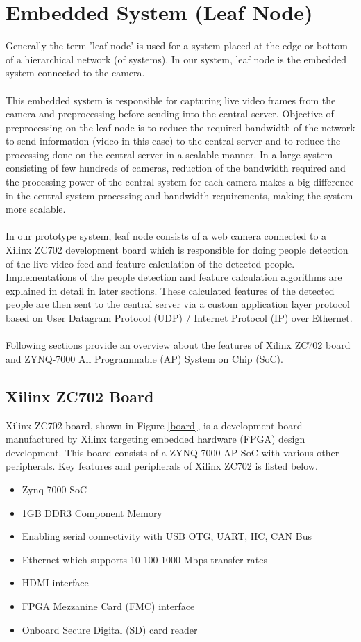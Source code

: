 \documentclass[12pt,a4paper]{report}
\begin{document}
\section{Embedded System (Leaf Node)}
Generally the term 'leaf node' is used for a system placed at the edge or bottom of a hierarchical network (of systems). In our system, leaf node is the embedded system connected to the camera.  \\\\
This embedded system  is responsible for capturing live video frames from the camera and preprocessing before sending into the central server. Objective of preprocessing on the leaf node is to reduce the required bandwidth of the network to send information (video in this case) to the central server and to reduce the processing done on the central server in a scalable manner. 
In a large system consisting of few hundreds of cameras, reduction of the bandwidth required and the processing power of the central system for each camera makes a big difference in the central system processing and bandwidth requirements, making the system more scalable.  
\\\\
In our prototype system, leaf node consists of a web camera connected to a Xilinx ZC702 development board which is responsible for doing people detection of the live video feed and feature calculation of the detected people. Implementations of the people detection and feature calculation algorithms are explained in detail in later sections. These calculated features of the detected people are then sent to the central server via a custom application layer protocol based on User Datagram Protocol (UDP) / Internet Protocol (IP) over Ethernet.
\\\\
Following sections provide an overview about the features of Xilinx ZC702 board and ZYNQ-7000 All Programmable (AP) System on Chip (SoC).

\subsection{Xilinx ZC702 Board}
Xilinx ZC702 board, shown in Figure \ref{board}, is a development board manufactured by Xilinx targeting embedded hardware (FPGA) design development. This board consists of a ZYNQ-7000 AP SoC with various other peripherals. Key features and peripherals of Xilinx ZC702 is listed below.




\begin{itemize}
\item Zynq-7000 SoC
\item 1GB DDR3 Component Memory
\item Enabling serial connectivity with USB OTG, UART, IIC, CAN Bus
\item Ethernet which supports 10-100-1000 Mbps transfer rates
\item HDMI interface
\item FPGA Mezzanine Card (FMC) interface
\item Onboard Secure Digital (SD) card reader
\end{itemize}
\end{document}
